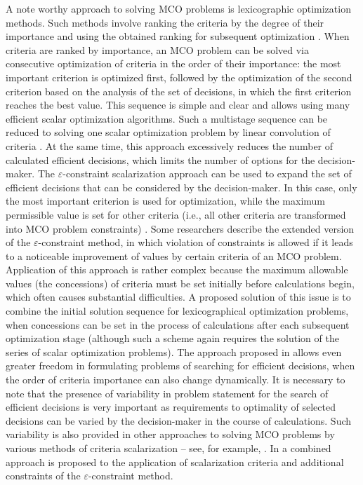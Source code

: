 \documentclass[smallextended]{svjour3}       %
\begin{document}
A note worthy approach to solving MCO problems is lexicographic optimization methods. Such methods involve ranking the criteria by the degree of their importance and using the obtained ranking for subsequent optimization \cite{c3}. When criteria are ranked by importance, an MCO problem can be solved via consecutive optimization of criteria in the order of their importance: the most important criterion is optimized first, followed by the optimization of the second criterion based on the analysis of the set of decisions, in which the first criterion reaches the best value. This sequence is simple and clear and allows using many efficient scalar optimization algorithms. Such a multistage sequence can be reduced to solving one scalar optimization problem by linear convolution of criteria \cite{c38}. At the same time, this approach excessively reduces the number of calculated efficient decisions, which limits the number of options for the decision-maker. The $\varepsilon$-constraint scalarization approach can be used to expand the set of efficient decisions that can be considered by the decision-maker. In this case, only the most important criterion is used for optimization, while the maximum permissible value is set for other criteria (i.e., all other criteria are transformed into MCO problem constraints) \cite{c39,c40}. Some researchers \cite{c41} describe the extended version of the $\varepsilon$-constraint method, in which violation of constraints is allowed if it leads to a noticeable improvement of values by certain criteria of an MCO problem. Application of this approach is rather complex because the maximum allowable values (the concessions) of criteria must be set initially before calculations begin, which often causes substantial difficulties. A proposed solution \cite{c42} of this issue is to combine the initial solution sequence for lexicographical optimization problems, when concessions can be set in the process of calculations after each subsequent optimization stage (although such a scheme again requires the solution of the series of scalar optimization problems). The approach proposed in \cite{c43} allows even greater freedom in formulating problems of searching for efficient decisions, when the order of criteria importance can also change dynamically. It is necessary to note that the presence of variability in problem statement for the search of efficient decisions is very important as requirements to optimality of selected decisions can be varied by the decision-maker in the course of calculations. Such variability is also provided in other approaches to solving MCO problems by various methods of criteria scalarization -- see, for example, \cite{c31,c44}. In \cite{c1} a combined approach is proposed to the application of scalarization criteria and additional constraints of the $\varepsilon$-constraint method.
\end{document}
